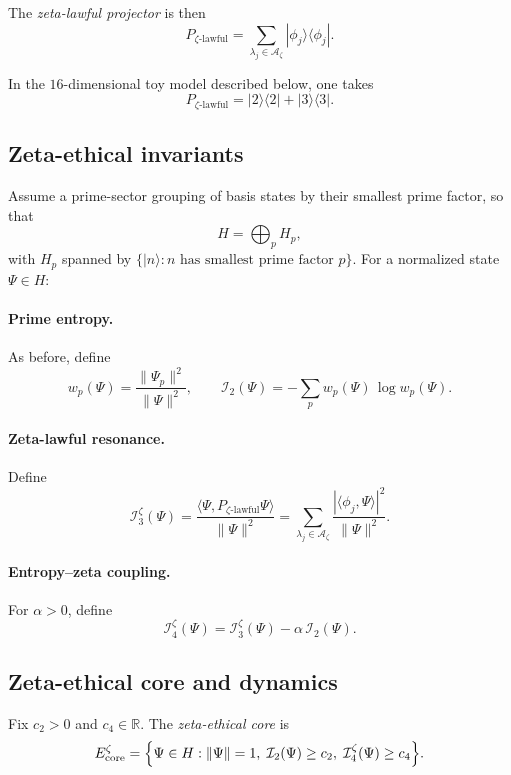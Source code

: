 \documentclass[11pt]{article}
\begin{document}
The \emph{zeta-lawful projector} is then
\[
  P_{\zeta\text{-lawful}} = \sum_{\lambda_j\in\mathcal{A}_\zeta} |\phi_j\rangle\langle\phi_j|.
\]

In the $16$-dimensional toy model described below, one takes
\[
  P_{\zeta\text{-lawful}} = |2\rangle\langle 2| + |3\rangle\langle 3|.
\]

\subsection{Zeta-ethical invariants}

Assume a prime-sector grouping of basis states by their smallest prime factor, so that
\[
  H = \bigoplus_p H_p,
\]
with $H_p$ spanned by $\{|n\rangle : n\text{ has smallest prime factor }p\}$.
For a normalized state $\Psi\in H$:

\paragraph{Prime entropy.}
As before, define
\[
  w_p(\Psi) = \frac{\|\Psi_p\|^2}{\|\Psi\|^2},\qquad
  \mathcal{I}_2(\Psi) = -\sum_p w_p(\Psi)\,\log w_p(\Psi).
\]

\paragraph{Zeta-lawful resonance.}
Define
\[
  \mathcal{I}_3^{\zeta}(\Psi)
  =
  \frac{\langle\Psi, P_{\zeta\text{-lawful}}\Psi\rangle}{\|\Psi\|^2}
  =
  \sum_{\lambda_j\in\mathcal{A}_\zeta}
  \frac{|\langle\phi_j,\Psi\rangle|^2}{\|\Psi\|^2}.
\]

\paragraph{Entropy--zeta coupling.}
For $\alpha>0$, define
\[
  \mathcal{I}_4^{\zeta}(\Psi)
  = \mathcal{I}_3^{\zeta}(\Psi) - \alpha\,\mathcal{I}_2(\Psi).
\]

\subsection{Zeta-ethical core and dynamics}

Fix $c_2>0$ and $c_4\in\mathbb{R}$. The \emph{zeta-ethical core} is
\begin{equation}
  E_{\mathrm{core}}^{\zeta}
  =
  \Bigl\{
    \Psi\in H :
    \|\Psi\|=1,\;
    \mathcal{I}_2(\Psi)\ge c_2,\;
    \mathcal{I}_4^{\zeta}(\Psi)\ge c_4
  \Bigr\}.
  \label{eq:Ecore-zeta}
\end{equation}
\end{document}
